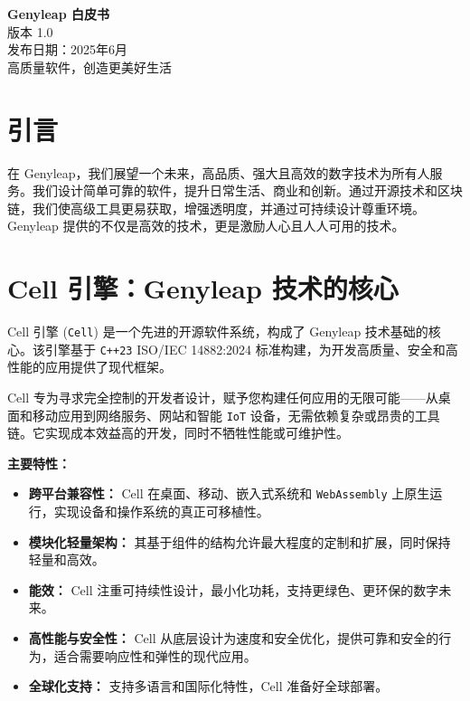 \documentclass[a4paper,12pt,openany]{book}
\begin{document}
\begin{titlepage}
    \begin{center}
        \vspace*{1.5cm}
        {\Huge \textbf{Genyleap 白皮书}} \\
        \vspace{0.5cm}
        {\Large 版本 1.0} \\
        \vspace{0.5cm}
        {\large 发布日期：2025年6月} \\
        \vspace{1.5cm}
        {\large 高质量软件，创造更美好生活} \\
    \end{center}
    \vfill
\end{titlepage}

\chapter{引言}
在 Genyleap，我们展望一个未来，高品质、强大且高效的数字技术为所有人服务。我们设计简单可靠的软件，提升日常生活、商业和创新。通过开源技术和区块链，我们使高级工具更易获取，增强透明度，并通过可持续设计尊重环境。Genyleap 提供的不仅是高效的技术，更是激励人心且人人可用的技术。

\chapter{Cell 引擎：Genyleap 技术的核心}

Cell 引擎 (\texttt{Cell}) 是一个先进的开源软件系统，构成了 Genyleap 技术基础的核心。该引擎基于 \texttt{C++23} ISO/IEC 14882:2024 标准构建，为开发高质量、安全和高性能的应用提供了现代框架。

Cell 专为寻求完全控制的开发者设计，赋予您构建任何应用的无限可能——从桌面和移动应用到网络服务、网站和智能 \texttt{IoT} 设备，无需依赖复杂或昂贵的工具链。它实现成本效益高的开发，同时不牺牲性能或可维护性。

\textbf{主要特性：}
\begin{itemize}
    \item \textbf{跨平台兼容性：} Cell 在桌面、移动、嵌入式系统和 \texttt{WebAssembly} 上原生运行，实现设备和操作系统的真正可移植性。
    \item \textbf{模块化轻量架构：} 其基于组件的结构允许最大程度的定制和扩展，同时保持轻量和高效。
    \item \textbf{能效：} Cell 注重可持续性设计，最小化功耗，支持更绿色、更环保的数字未来。
    \item \textbf{高性能与安全性：} Cell 从底层设计为速度和安全优化，提供可靠和安全的行为，适合需要响应性和弹性的现代应用。
    \item \textbf{全球化支持：} 支持多语言和国际化特性，Cell 准备好全球部署。
\end{itemize}
\end{document}
